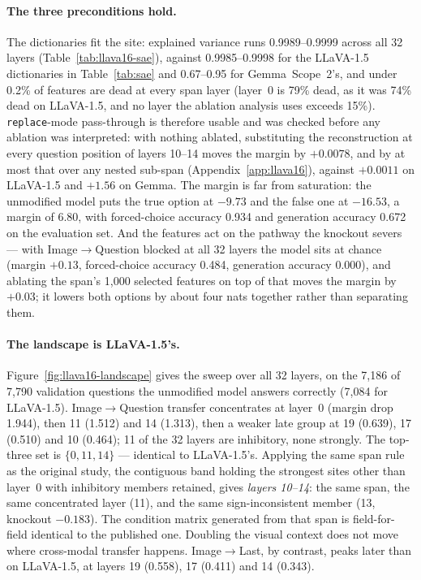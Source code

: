 \documentclass[11pt,a4paper]{article}
\begin{document}
\paragraph{The three preconditions hold.} The dictionaries fit the site:
explained variance runs 0.9989--0.9999 across all 32 layers
(Table~\ref{tab:llava16-sae}), against 0.9985--0.9998 for the LLaVA-1.5
dictionaries in Table~\ref{tab:sae} and 0.67--0.95 for Gemma~Scope~2's, and
under 0.2\% of features are dead at every span layer (layer~0 is 79\% dead, as
it was 74\% dead on LLaVA-1.5, and no layer the ablation analysis uses exceeds
15\%). \texttt{replace}-mode pass-through
is therefore usable and was checked before any ablation was interpreted: with
nothing ablated, substituting the reconstruction at every question position of
layers 10--14 moves the margin by $+0.0078$, and by at most that over any nested
sub-span (Appendix~\ref{app:llava16}), against $+0.0011$ on LLaVA-1.5 and
$+1.56$ on Gemma. The margin is far from saturation: the unmodified model puts
the true option at $-9.73$ and the false one at $-16.53$, a margin of 6.80, with
forced-choice accuracy 0.934 and generation accuracy 0.672 on the evaluation
set. And the features act on the pathway the knockout severs --- with
Image$\rightarrow$Question blocked at all 32 layers the model sits at chance
(margin $+0.13$, forced-choice accuracy 0.484, generation accuracy 0.000), and
ablating the span's 1{,}000 selected features on top of that moves the margin by
$+0.03$; it lowers both options by about four nats together rather than
separating them.

\paragraph{The landscape is LLaVA-1.5's.} Figure~\ref{fig:llava16-landscape}
gives the sweep over all 32 layers, on the 7{,}186 of 7{,}790 validation
questions the unmodified model answers correctly (7{,}084 for LLaVA-1.5).
Image$\rightarrow$Question transfer concentrates at layer~0 (margin drop 1.944),
then 11 (1.512) and 14 (1.313), then a weaker late group at 19 (0.639), 17
(0.510) and 10 (0.464); 11 of the 32 layers are inhibitory, none strongly.
The top-three set is $\{0, 11, 14\}$ --- identical to LLaVA-1.5's. Applying the
same span rule as the original study, the contiguous band holding the strongest
sites other than layer~0 with inhibitory members retained, gives \emph{layers
10--14}: the same span, the same concentrated layer (11), and the same
sign-inconsistent member (13, knockout $-0.183$). The condition matrix generated
from that span is field-for-field identical to the published one. Doubling the
visual context does not move where cross-modal transfer happens.
Image$\rightarrow$Last, by contrast, peaks later than on LLaVA-1.5, at layers 19
(0.558), 17 (0.411) and 14 (0.343).
\end{document}
